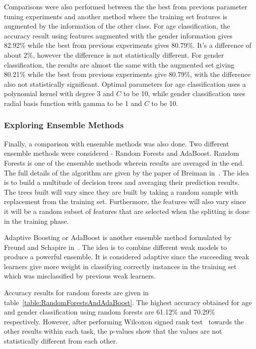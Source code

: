 \documentclass[a4paper]{llncs}
\begin{document}
Comparisons were also performed between the the best from previous parameter tuning experiments and another method where the training set features is augmented by the information of the other class. For age classification, the accuracy result using features augmented with the gender information gives 82.92\% while the best from previous experiments gives 80.79\%. It's a difference of about 2\%, however the difference is not statistically different. For gender classification, the results are almost the same with the augmented set giving 80.21\% while the best from previous experiments give 80.79\%, with the difference also not statistically significant. Optimal parameters for age classification uses a polynomial kernel with degree 3 and $C$ to be 10, while gender classification uses radial basis function with gamma to be 1 and $C$ to be 10.


\subsubsection{Exploring Ensemble Methods}
Finally, a comparison with ensemble methods was also done. Two different ensemble methods were considered - Random Forests and AdaBoost. Random Forests is one of the ensemble methods wherein results are averaged in the end. The full details of the algorithm are given by the paper of Breiman in~\cite{breiman2001random}. The idea is to build a multitude of decision trees and averaging their prediction results. The trees built will vary since they are built by taking a random sample with replacement from the training set. Furthermore, the features will also vary since it will be a random subset of features that are selected when the splitting is done in the training phase. 

Adaptive Boosting or AdaBoost is another ensemble method formulated by Freund and Schapire in~\cite{freund1997decision}. The idea is to combine different weak models to produce a powerful ensemble. It is considered adaptive since the succeeding weak learners give more weight in classifying correctly instances in the training set which was misclassified by previous weak learners. 

Accuracy results for random forests are given in table~\ref{table:RandomForestsAndAdaBoost}. The highest accuracy obtained for age and gender classification using random forests are 61.12\% and 70.29\% respectively. However, after performing Wilcoxon signed rank test~\cite{wilcoxon1945individual} towards the other results within each task, the p-values show that the values are not statistically different from each other.  
\end{document}
